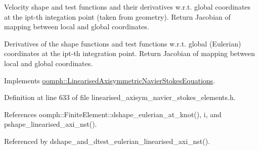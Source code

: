 Velocity shape and test functions and their derivatives w.\+r.\+t. global coordinates at the ipt-\/th integation point (taken from geometry). Return Jacobian of mapping between local and global coordinates. 

Derivatives of the shape functions and test functions w.\+r.\+t. global (Eulerian) coordinates at the ipt-\/th integration point. Return Jacobian of mapping between local and global coordinates. 

Implements \hyperlink{classoomph_1_1LinearisedAxisymmetricNavierStokesEquations_aa42c291276849d54300289506e8c365b}{oomph\+::\+Linearised\+Axisymmetric\+Navier\+Stokes\+Equations}.



Definition at line 633 of file linearised\+\_\+axisym\+\_\+navier\+\_\+stokes\+\_\+elements.\+h.



References oomph\+::\+Finite\+Element\+::dshape\+\_\+eulerian\+\_\+at\+\_\+knot(), i, and pshape\+\_\+linearised\+\_\+axi\+\_\+nst().



Referenced by dshape\+\_\+and\+\_\+dtest\+\_\+eulerian\+\_\+linearised\+\_\+axi\+\_\+nst().

\mbox{\label{classoomph_1_1LinearisedAxisymmetricQCrouzeixRaviartElement_a8b78103c409fbe8842b7a25510ad15fb}} 
